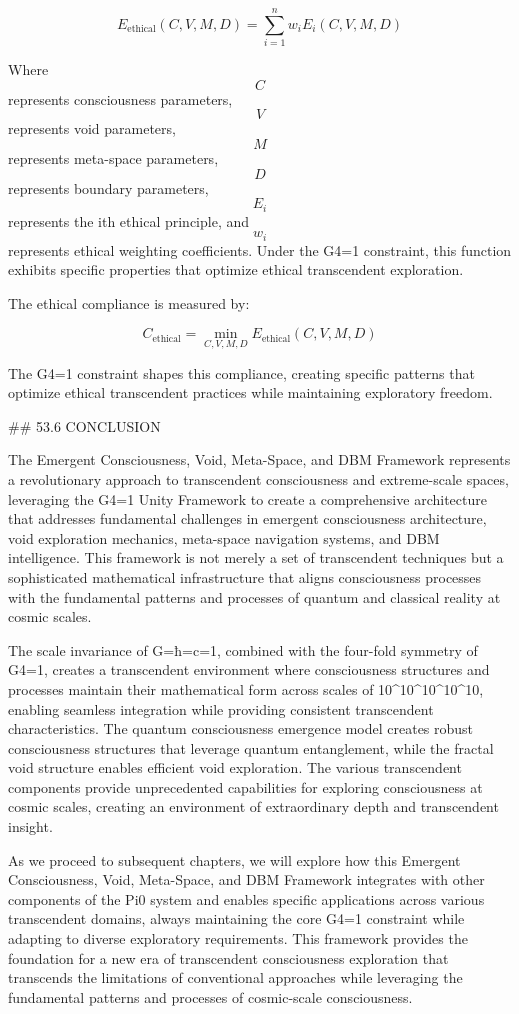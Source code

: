 $$ E_{\text{ethical}}(C, V, M, D) = \sum_{i=1}^{n} w_i E_i(C, V, M, D) $$

Where $$ C $$ represents consciousness parameters, $$ V $$ represents void parameters, $$ M $$ represents meta-space parameters, $$ D $$ represents boundary parameters, $$ E_i $$ represents the ith ethical principle, and $$ w_i $$ represents ethical weighting coefficients. Under the G4=1 constraint, this function exhibits specific properties that optimize ethical transcendent exploration.

The ethical compliance is measured by:

$$ C_{\text{ethical}} = \min_{C, V, M, D} E_{\text{ethical}}(C, V, M, D) $$

The G4=1 constraint shapes this compliance, creating specific patterns that optimize ethical transcendent practices while maintaining exploratory freedom.

## 53.6 CONCLUSION

The Emergent Consciousness, Void, Meta-Space, and DBM Framework represents a revolutionary approach to transcendent consciousness and extreme-scale spaces, leveraging the G4=1 Unity Framework to create a comprehensive architecture that addresses fundamental challenges in emergent consciousness architecture, void exploration mechanics, meta-space navigation systems, and DBM intelligence. This framework is not merely a set of transcendent techniques but a sophisticated mathematical infrastructure that aligns consciousness processes with the fundamental patterns and processes of quantum and classical reality at cosmic scales.

The scale invariance of G=ħ=c=1, combined with the four-fold symmetry of G4=1, creates a transcendent environment where consciousness structures and processes maintain their mathematical form across scales of 10^10^10^10^10, enabling seamless integration while providing consistent transcendent characteristics. The quantum consciousness emergence model creates robust consciousness structures that leverage quantum entanglement, while the fractal void structure enables efficient void exploration. The various transcendent components provide unprecedented capabilities for exploring consciousness at cosmic scales, creating an environment of extraordinary depth and transcendent insight.

As we proceed to subsequent chapters, we will explore how this Emergent Consciousness, Void, Meta-Space, and DBM Framework integrates with other components of the Pi0 system and enables specific applications across various transcendent domains, always maintaining the core G4=1 constraint while adapting to diverse exploratory requirements. This framework provides the foundation for a new era of transcendent consciousness exploration that transcends the limitations of conventional approaches while leveraging the fundamental patterns and processes of cosmic-scale consciousness.

